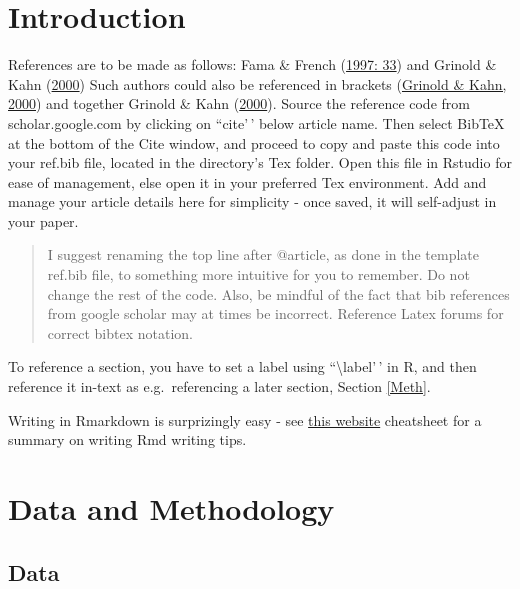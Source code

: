 \documentclass[11pt,preprint, authoryear]{elsarticle}
\numberwithin{equation}{section}
\numberwithin{figure}{section}
\numberwithin{table}{section}
\begin{document}
\headsep 35pt %




\hypertarget{introduction}{%
\section{\texorpdfstring{Introduction
\label{Introduction}}{Introduction }}\label{introduction}}

References are to be made as follows: Fama \& French
(\protect\hyperlink{ref-fama1997}{1997: 33}) and Grinold \& Kahn
(\protect\hyperlink{ref-grinold2000}{2000}) Such authors could also be
referenced in brackets (\protect\hyperlink{ref-grinold2000}{Grinold \&
Kahn, 2000}) and together Grinold \& Kahn
(\protect\hyperlink{ref-grinold2000}{2000}). Source the reference code
from scholar.google.com by clicking on ``cite'\,' below article name.
Then select BibTeX at the bottom of the Cite window, and proceed to copy
and paste this code into your ref.bib file, located in the directory's
Tex folder. Open this file in Rstudio for ease of management, else open
it in your preferred Tex environment. Add and manage your article
details here for simplicity - once saved, it will self-adjust in your
paper.

\begin{quote}
I suggest renaming the top line after @article, as done in the template
ref.bib file, to something more intuitive for you to remember. Do not
change the rest of the code. Also, be mindful of the fact that bib
references from google scholar may at times be incorrect. Reference
Latex forums for correct bibtex notation.
\end{quote}

To reference a section, you have to set a label using
``\textbackslash label'\,' in R, and then reference it in-text as
e.g.~referencing a later section, Section \ref{Meth}.

Writing in Rmarkdown is surprizingly easy - see
\href{https://www.rstudio.com/wp-content/uploads/2015/03/rmarkdown-reference.pdf}{this
website} cheatsheet for a summary on writing Rmd writing tips.

\hypertarget{data-and-methodology}{%
\section{Data and Methodology}\label{data-and-methodology}}

\hypertarget{data}{%
\subsection{Data}\label{data}}
\end{document}

